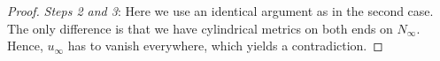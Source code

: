 \documentclass[preprint,12pt]{elsarticle}
\numberwithin{table}{section}
\renewcommand{\d}{\operatorname{d}\!}
\begin{document}
\begin{proof}
	\noindent
	\textit{Steps 2 and 3}: Here we use an identical argument as in the second case. The only difference is that we have cylindrical metrics on both ends on $N_\infty$. Hence, $u_\infty$ has to vanish everywhere, which yields a contradiction.
\end{proof}
\end{document}
